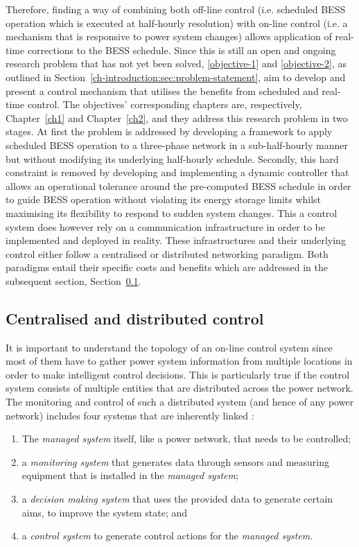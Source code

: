 Therefore, finding a way of combining both off-line control (i.e. scheduled BESS operation which is executed at half-hourly resolution) with on-line control (i.e. a mechanism that is responsive to power system changes) allows application of real-time corrections to the BESS schedule.
Since this is still an open and ongoing research problem that has not yet been solved, \ref{objective-1} and \ref{objective-2}, as outlined in Section~\ref{ch-introduction:sec:problem-statement}, aim to develop and present a control mechanism that utilises the benefits from scheduled and real-time control.
The objectives' corresponding chapters are, respectively, Chapter~\ref{ch1} and Chapter~\ref{ch2}, and they address this research problem in two stages.
At first the problem is addressed by developing a framework to apply scheduled BESS operation to a three-phase network in a sub-half-hourly manner but without modifying its underlying half-hourly schedule.
Secondly, this hard constraint is removed by developing and implementing a dynamic controller that allows an operational tolerance around the pre-computed BESS schedule in order to guide BESS operation without violating its energy storage limits whilst maximising its flexibility to respond to sudden system changes.
This a control system does however rely on a communication infrastructure in order to be implemented and deployed in reality.
These infrastructures and their underlying control either follow a centralised or distributed networking paradigm.
Both paradigms entail their specific costs and benefits which are addressed in the subsequent section, Section~\ref{ch-literature:subsec:centralised-and-distributed-control}.

\subsection{Centralised and distributed control}
\label{ch-literature:subsec:centralised-and-distributed-control}

It is important to understand the topology of an on-line control system since most of them have to gather power system information from multiple locations in order to make intelligent control decisions.
This is particularly true if the control system consists of multiple entities that are distributed across the power network.
The monitoring and control of such a distributed system (and hence of any power network) includes four systems that are inherently linked \cite{Mansouri-Samani1993}:

\begin{enumerate}
	\item The \textit{managed system} itself, like a power network, that needs to be controlled;
	\item a \textit{monitoring system} that generates data through sensors and measuring equipment that is installed in the \textit{managed system};
	\item a \textit{decision making system} that uses the provided data to generate certain aims, to improve the system state; and
	\item a \textit{control system} to generate control actions for the \textit{managed system}.
\end{enumerate}

